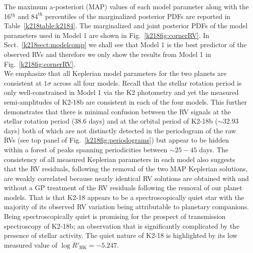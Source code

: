 The maximum a-posteriori (MAP) values of each model parameter along with the 16$^{\text{th}}$
and $84^{\text{th}}$ percentiles of
the marginalized posterior PDFs are reported in Table~\ref{k218table:k2184}. The marginalized and joint posterior
PDFs of the model parameters used in Model 1 are shown in Fig.~\ref{k218fig:cornerRV}. In Sect.~\ref{k218sect:modelcomp}
we shall see that Model 1 is the best predictor of the observed RVs and therefore we only show the results from
Model 1 in Fig.~\ref{k218fig:cornerRV}. \\

We emphasize that all Keplerian 
model parameters for the two planets are consistent at $1\sigma$ across all four models. Recall that the stellar
rotation period is only well-constrained in Model 1 via the K2 photometry and yet the measured semi-amplitudes of
K2-18b are consistent in each of the four models. This further demonstrates that there is minimal confusion between
the RV signals at the stellar rotation period (38.6 days) and at the orbital period of K2-18b ($\sim 32.93$ days)
both of which are not distinctly detected in the periodogram of the raw RVs (see top panel of Fig.~\ref{k218fig:periodograms})
but appear to be hidden within a forest of peaks spanning periodicities between $\sim 25-45$ days. 
The consistency of all measured Keplerian parameters in each model also suggests that the RV residuals,
following the removal of the two MAP Keplerian solutions, are weakly correlated because nearly identical RV solutions
are obtained with and without a GP treatment of the RV residuals following the removal of our planet models.
That is that K2-18 appears to be a spectroscopically quiet star with the majority of its observed RV variation being
attributable to planetary companions. Being spectroscopically quiet is promising for the prospect of
transmission spectroscopy of K2-18b; an observation that is significantly complicated by the presence of
stellar activity. The quiet nature of K2-18 is highlighted by its low measured value of $\log{R'_{\text{HK}}}=-5.247$.  

